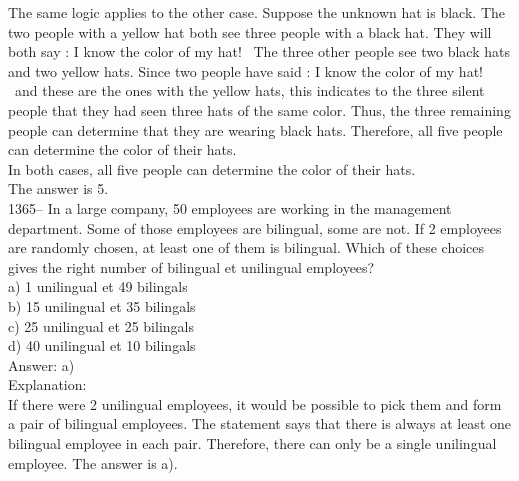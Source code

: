 \documentclass[letterpaper, 12pt]{article}
\begin{document}
The same logic applies to the other case. Suppose the unknown hat is black. The two people with a yellow hat both see three people with a black hat. They will both say : \og I know the color of my hat! \fg\ The three other people see two black hats and two yellow hats. Since two people have said : \og I know the color of my hat! \fg\ and these are the ones with the yellow hats, this indicates to the three silent people that they had seen three hats of the same color. Thus, the three remaining people can determine that they are wearing black hats. Therefore, all five people can determine the color of their hats.\\

In both cases, all five people can determine the color of their hats.\\

The answer is 5.\\


1365-- In a large company, 50 employees are working in the management department. Some of those employees are bilingual, some are not. If 2 employees are randomly chosen, at least one of them is bilingual. Which of these choices gives the right number of bilingual et unilingual employees?\\

a) 1 unilingual et 49 bilingals\\
b) 15 unilingual et 35 bilingals\\
c) 25 unilingual et 25 bilingals\\
d) 40 unilingual et 10 bilingals\\

Answer: a)\\

Explanation: \\
If there were 2 unilingual employees, it would be possible to pick them and form a pair of bilingual employees. The statement says that there is always at least one bilingual employee in each pair. Therefore, there can only be a single unilingual employee. The answer is a).\\
\end{document}
